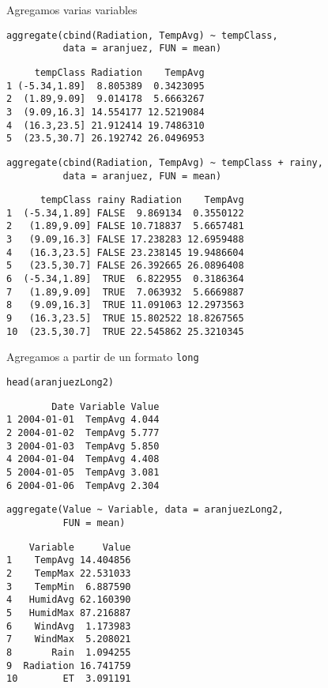 \documentclass[xcolor={usenames,svgnames,dvipsnames}]{beamer}
\begin{document}
\begin{frame}[fragile,label=sec-4-3]{Agregamos varias variables}
 \lstset{language=R,label= ,caption= ,numbers=none}
\begin{lstlisting}
aggregate(cbind(Radiation, TempAvg) ~ tempClass,
          data = aranjuez, FUN = mean)
\end{lstlisting}

\begin{verbatim}
     tempClass Radiation    TempAvg
1 (-5.34,1.89]  8.805389  0.3423095
2  (1.89,9.09]  9.014178  5.6663267
3  (9.09,16.3] 14.554177 12.5219084
4  (16.3,23.5] 21.912414 19.7486310
5  (23.5,30.7] 26.192742 26.0496953
\end{verbatim}

\lstset{language=R,label= ,caption= ,numbers=none}
\begin{lstlisting}
aggregate(cbind(Radiation, TempAvg) ~ tempClass + rainy,
          data = aranjuez, FUN = mean)
\end{lstlisting}

\begin{verbatim}
      tempClass rainy Radiation    TempAvg
1  (-5.34,1.89] FALSE  9.869134  0.3550122
2   (1.89,9.09] FALSE 10.718837  5.6657481
3   (9.09,16.3] FALSE 17.238283 12.6959488
4   (16.3,23.5] FALSE 23.238145 19.9486604
5   (23.5,30.7] FALSE 26.392665 26.0896408
6  (-5.34,1.89]  TRUE  6.822955  0.3186364
7   (1.89,9.09]  TRUE  7.063932  5.6669887
8   (9.09,16.3]  TRUE 11.091063 12.2973563
9   (16.3,23.5]  TRUE 15.802522 18.8267565
10  (23.5,30.7]  TRUE 22.545862 25.3210345
\end{verbatim}
\end{frame}


\begin{frame}[fragile,label=sec-4-4]{Agregamos a partir de un formato \texttt{long}}
 \lstset{language=R,label= ,caption= ,numbers=none}
\begin{lstlisting}
head(aranjuezLong2)
\end{lstlisting}

\begin{verbatim}
        Date Variable Value
1 2004-01-01  TempAvg 4.044
2 2004-01-02  TempAvg 5.777
3 2004-01-03  TempAvg 5.850
4 2004-01-04  TempAvg 4.408
5 2004-01-05  TempAvg 3.081
6 2004-01-06  TempAvg 2.304
\end{verbatim}

\lstset{language=R,label= ,caption= ,numbers=none}
\begin{lstlisting}
aggregate(Value ~ Variable, data = aranjuezLong2,
          FUN = mean)
\end{lstlisting}

\begin{verbatim}
    Variable     Value
1    TempAvg 14.404856
2    TempMax 22.531033
3    TempMin  6.887590
4   HumidAvg 62.160390
5   HumidMax 87.216887
6    WindAvg  1.173983
7    WindMax  5.208021
8       Rain  1.094255
9  Radiation 16.741759
10        ET  3.091191
\end{verbatim}
\end{frame}
\end{document}
